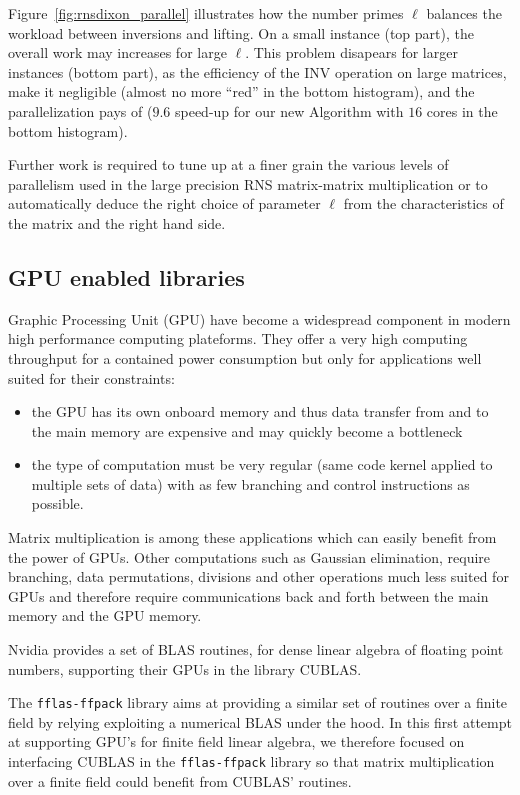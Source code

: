 Figure~\ref{fig:rnsdixon_parallel} illustrates how the number primes $\ell$
balances the workload between inversions and lifting. On a small instance (top
part), the overall work may increases for large $\ell$. This problem disapears
for larger instances (bottom part), as the efficiency of the INV operation on
large matrices, make it negligible (almost
no more ``red'' in the bottom histogram), and the parallelization pays
of ($9.6$ speed-up for our new Algorithm with $16$ cores in the bottom
histogram).



Further work is required to tune up at a finer grain the various
levels of parallelism used in the large precision RNS matrix-matrix
multiplication or to automatically deduce the right choice of
parameter $\ell$ from the characteristics of the matrix and the right
hand side.

\subsection{GPU enabled libraries}

Graphic Processing Unit (GPU) have become a widespread component in modern high performance computing plateforms. They
offer a very high computing throughput for a contained power consumption but only for applications well suited for their
constraints:
\begin{itemize}
\item the GPU has its own onboard memory and thus data transfer from and to the main memory are expensive and may
  quickly become a bottleneck
\item the type of computation must be very regular (same code kernel applied to multiple sets of data) with as few
  branching and control instructions as possible.
\end{itemize}

Matrix multiplication is among these applications which can easily benefit from the power of GPUs. Other computations
such as Gaussian elimination, require branching, data permutations, divisions and other operations much less suited for
GPUs and therefore require communications back and forth between the main memory and the GPU memory.

Nvidia provides a set of BLAS routines, for dense linear algebra of floating point numbers, supporting their GPUs in the
library CUBLAS.

The \texttt{fflas-ffpack} library aims at providing a similar set of routines over a finite field by relying exploiting a
numerical BLAS under the hood. In this first attempt at supporting GPU's for finite field linear algebra, we therefore
focused on interfacing CUBLAS in the \texttt{fflas-ffpack} library so that matrix multiplication over a finite field
could benefit from CUBLAS' routines.

